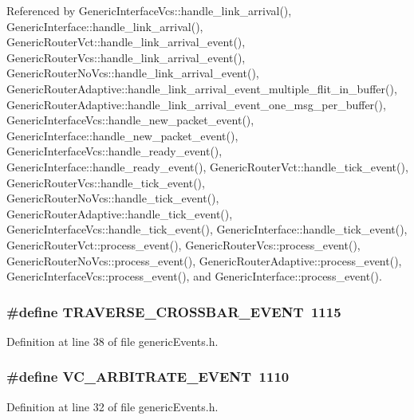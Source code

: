 Referenced by GenericInterfaceVcs::handle\_\-link\_\-arrival(), GenericInterface::handle\_\-link\_\-arrival(), GenericRouterVct::handle\_\-link\_\-arrival\_\-event(), GenericRouterVcs::handle\_\-link\_\-arrival\_\-event(), GenericRouterNoVcs::handle\_\-link\_\-arrival\_\-event(), GenericRouterAdaptive::handle\_\-link\_\-arrival\_\-event\_\-multiple\_\-flit\_\-in\_\-buffer(), GenericRouterAdaptive::handle\_\-link\_\-arrival\_\-event\_\-one\_\-msg\_\-per\_\-buffer(), GenericInterfaceVcs::handle\_\-new\_\-packet\_\-event(), GenericInterface::handle\_\-new\_\-packet\_\-event(), GenericInterfaceVcs::handle\_\-ready\_\-event(), GenericInterface::handle\_\-ready\_\-event(), GenericRouterVct::handle\_\-tick\_\-event(), GenericRouterVcs::handle\_\-tick\_\-event(), GenericRouterNoVcs::handle\_\-tick\_\-event(), GenericRouterAdaptive::handle\_\-tick\_\-event(), GenericInterfaceVcs::handle\_\-tick\_\-event(), GenericInterface::handle\_\-tick\_\-event(), GenericRouterVct::process\_\-event(), GenericRouterVcs::process\_\-event(), GenericRouterNoVcs::process\_\-event(), GenericRouterAdaptive::process\_\-event(), GenericInterfaceVcs::process\_\-event(), and GenericInterface::process\_\-event().
\subsubsection[{TRAVERSE\_\-CROSSBAR\_\-EVENT}]{\setlength{\rightskip}{0pt plus 5cm}\#define TRAVERSE\_\-CROSSBAR\_\-EVENT~1115}\label{genericEvents_8h_aaa7b295ef7618dace9405e397aef72b}




Definition at line 38 of file genericEvents.h.
\subsubsection[{VC\_\-ARBITRATE\_\-EVENT}]{\setlength{\rightskip}{0pt plus 5cm}\#define VC\_\-ARBITRATE\_\-EVENT~1110}\label{genericEvents_8h_771bcff5997b2b13479d515411b7ed51}




Definition at line 32 of file genericEvents.h.